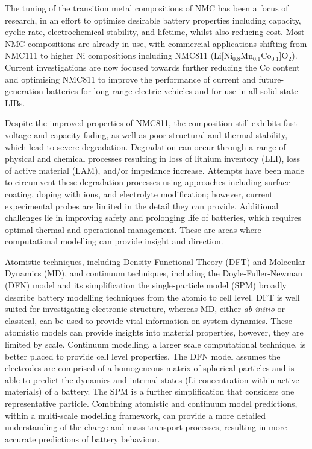 \documentclass[aps,prb,twocolumn,superscriptaddress,reprint]{revtex4-1}
\begin{document}
The tuning of the transition metal compositions of NMC has been a focus of research, in an effort to optimise desirable battery properties including capacity, cyclic rate, electrochemical stability, and lifetime, whilst also reducing cost. \cite{duan2019insights} Most NMC compositions are already in use, with commercial applications shifting from NMC111 to higher Ni compositions including NMC811 (Li[Ni$_{0.8}$Mn$_{0.1}$Co$_{0.1}$]O$_2$). \cite{zhang2018structural} 
Current investigations are now focused towards further reducing the Co content and optimising NMC811 to improve the performance of current and future-generation batteries for long-range electric vehicles \cite{azevedo2018mining} and for use in all-solid-state LIBs. \cite{myung2017nickel,ohzuku_layered_2001, lu2001layered,belharouak2003li,kim2014unexpected,sun_electronic_2017}

Despite the improved properties of NMC811, the composition still exhibits fast voltage and capacity fading, as well as poor structural and thermal stability\cite{noh2013comparison,Li-aenm-2019,Jerng-ACS-AMI-2020}, which lead to severe degradation. \cite{Zhang-acs.chemmater-2019,Feng-2019,Xia2018,De-AdMat-2019,Li_Nat-Comm-2017,Manthiram-NatComm-2020} Degradation can occur through a range of physical and chemical processes resulting in loss of lithium inventory (LLI), loss of active material (LAM), and/or impedance increase.\cite{vetter2005ageing} 
Attempts have been made to circumvent these degradation processes using approaches including surface coating, doping with ions, and electrolyte modification;\cite{maleki2019controllable,Liu-JSSE-2020} however, current experimental probes are limited in the detail they can provide. 
Additional challenges lie in improving safety and prolonging life of batteries, which requires optimal thermal and operational management. 
These are areas where computational modelling can provide insight and direction.

Atomistic techniques, including Density Functional Theory (DFT) and Molecular Dynamics (MD), and continuum techniques, including the Doyle-Fuller-Newman (DFN) model and its simplification the single-particle model (SPM) \cite{Newman1975porous, Doyle1993DFN} broadly describe battery modelling techniques from the atomic to cell level. \cite{Howey_2020} 
DFT is well suited for investigating electronic structure, whereas MD, either \textit{ab-initio} or classical, can be used to provide vital information on system dynamics. These atomistic models can provide insights into material properties, however, they are limited by scale. 
Continuum modelling, a larger scale computational technique, is better placed to provide cell level properties. 
The DFN model assumes the electrodes are comprised of a homogeneous matrix of spherical particles and is able to predict the dynamics and internal states (Li concentration within active materials) of a battery. The SPM is a further simplification that considers one representative particle.
Combining atomistic and continuum model predictions, within a multi-scale modelling framework, can provide a more detailed understanding of the charge and mass transport processes, resulting in more accurate predictions of battery behaviour.
\end{document}
